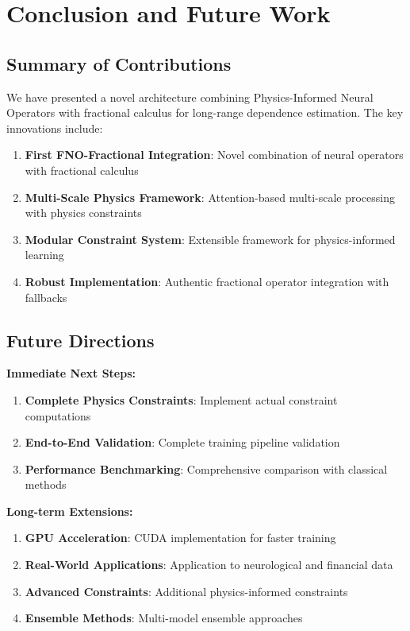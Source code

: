 \documentclass[11pt,a4paper]{article}
\begin{document}
\section{Conclusion and Future Work}

\subsection{Summary of Contributions}

We have presented a novel architecture combining Physics-Informed Neural Operators with fractional calculus for long-range dependence estimation. The key innovations include:

\begin{enumerate}
    \item \textbf{First FNO-Fractional Integration}: Novel combination of neural operators with fractional calculus
    \item \textbf{Multi-Scale Physics Framework}: Attention-based multi-scale processing with physics constraints
    \item \textbf{Modular Constraint System}: Extensible framework for physics-informed learning
    \item \textbf{Robust Implementation}: Authentic fractional operator integration with fallbacks
\end{enumerate}

\subsection{Future Directions}

\textbf{Immediate Next Steps:}
\begin{enumerate}
    \item \textbf{Complete Physics Constraints}: Implement actual constraint computations
    \item \textbf{End-to-End Validation}: Complete training pipeline validation
    \item \textbf{Performance Benchmarking}: Comprehensive comparison with classical methods
\end{enumerate}

\textbf{Long-term Extensions:}
\begin{enumerate}
    \item \textbf{GPU Acceleration}: CUDA implementation for faster training
    \item \textbf{Real-World Applications}: Application to neurological and financial data
    \item \textbf{Advanced Constraints}: Additional physics-informed constraints
    \item \textbf{Ensemble Methods}: Multi-model ensemble approaches
\end{enumerate}
\end{document}
